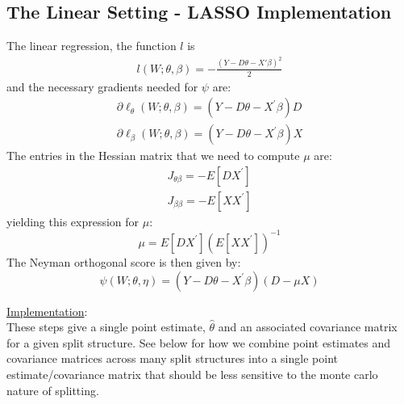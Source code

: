 \documentclass[11pt]{article}
\begin{document}
\subsection{The Linear Setting - LASSO Implementation}
The linear regression, the function $l$ is
\begin{gather*}
	l(W; \theta, \beta) = -\frac{(Y - D\theta - X'\beta)^2}{2}
\end{gather*}
and the necessary gradients needed for $\psi$ are:
\begin{gather*}
	\partial \ell_{\theta}(W ; \theta, \beta)=\left(Y-D \theta-X^{\prime} \beta\right) D \\
  \partial \ell_{\beta}(W ; \theta, \beta)=\left(Y-D \theta-X^{\prime} \beta\right) X
\end{gather*}
The entries in the Hessian matrix that we need to compute $\mu$ are:
\begin{gather*}
	J_{\theta \beta}=-E\left[D X^{\prime}\right] \\
  J_{\beta \beta}=-E\left[X X^{\prime}\right]
\end{gather*}
yielding this expression for $\mu$:
$$	\mu = E\left[D X^{\prime}\right]\left(E\left[X X^{\prime}\right]\right)^{-1}$$
The Neyman orthogonal score is then given by:
$$ \psi(W ; \theta, \eta)=\left(Y-D \theta-X^{\prime} \beta\right)(D-\mu X) $$

\noindent \underline{Implementation}: \\
These steps give a single point estimate, $\hat{\theta}$ and an associated covariance matrix for a given split structure.  See below for how we combine point estimates and covariance matrices across many split structures into a single point estimate/covariance matrix that should be less sensitive to the monte carlo nature of splitting.
\end{document}
